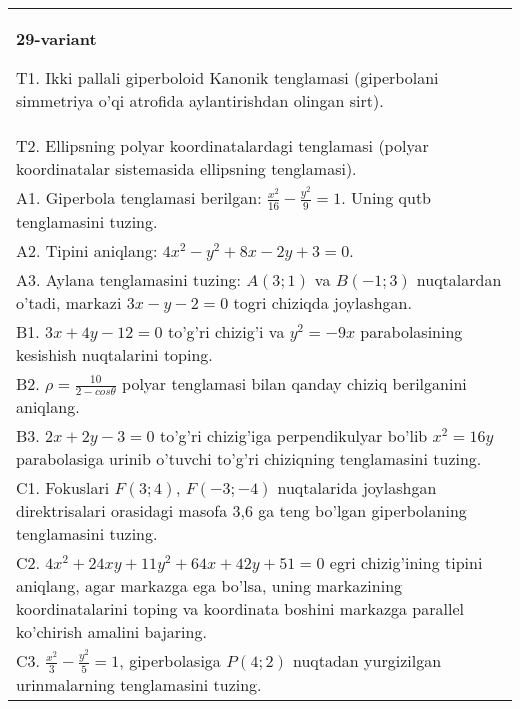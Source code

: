 \documentclass{article}
\begin{document}
\begin{tabular}{m{17cm}}
\textbf{29-variant}
\newline

T1. Ikki pallali giperboloid Kanonik tenglamasi (giperbolani simmetriya o'qi atrofida aylantirishdan olingan sirt).\\

T2. Ellipsning polyar koordinatalardagi tenglamasi (polyar koordinatalar sistemasida ellipsning tenglamasi).\\

A1. Giperbola tenglamasi berilgan: $\frac{x^{2}}{16}-\frac{y^{2}}{9}=1$. Uning qutb tenglamasini tuzing.\\

A2. Tipini aniqlang: $4x^{2}-y^{2}+8x-2y+3=0$.\\

A3. Aylana tenglamasini tuzing: $A(3;1)$ va $B(-1;3)$ nuqtalardan o'tadi, markazi $3x-y-2=0$ togri chiziqda joylashgan.\\

B1. $3x + 4y - 12 = 0$ to'g'ri chizig'i va $y^{2} = - 9x$ parabolasining kesishish nuqtalarini toping.\\

B2. $\rho = \frac{10}{2 - cos\theta}$ polyar tenglamasi bilan qanday chiziq berilganini aniqlang.  \\

B3. $2x + 2y - 3 = 0$ to'g'ri chizig'iga perpendikulyar bo'lib $x^{2} = 16y$ parabolasiga urinib o'tuvchi to'g'ri chiziqning tenglamasini tuzing.  \\

C1. Fokuslari $F(3;4)$, $F(-3;-4)$ nuqtalarida joylashgan direktrisalari orasidagi masofa 3,6 ga teng bo'lgan giperbolaning tenglamasini tuzing.  \\

C2. $4x^{2} + 24xy + 11y^{2} + 64x + 42y + 51 = 0$ egri chizig'ining tipini aniqlang, agar markazga ega bo'lsa, uning markazining koordinatalarini toping va koordinata boshini markazga parallel ko'chirish amalini bajaring.\\

C3. $\frac{x^{2}}{3} - \frac{y^{2}}{5} = 1$, giperbolasiga $P(4;2)$ nuqtadan yurgizilgan urinmalarning tenglamasini tuzing.  \\

\end{tabular}
\vspace{1cm}
\end{document}
